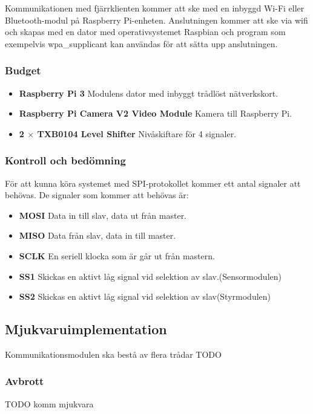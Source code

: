 \documentclass[designspec/spec.tex]{subfiles}
\begin{document}
Kommunikationen med fjärrklienten kommer att ske med en inbyggd Wi-Fi eller
Bluetooth-modul på Raspberry Pi-enheten. Anslutningen kommer att ske via wifi
och skapas med en dator med operativsystemet Raspbian och program som
exempelvis wpa\_supplicant kan användas för att sätta upp anslutningen.

\subsubsection{Budget}
\begin{itemize}
    \item \textbf{Raspberry Pi 3} Modulens dator med inbyggt trådlöst
    nätverkskort.
    \item \textbf{Raspberry Pi Camera V2 Video Module} Kamera till Raspberry
    Pi.
    \item \textbf{2 $\times$ TXB0104 Level Shifter} Nivåskiftare för 4
    signaler.
\end{itemize}

\subsubsection{Kontroll och bedömning}
För att kunna köra systemet med SPI-protokollet kommer ett antal signaler att
behövas. De signaler som kommer att behövas är:
\begin{itemize}
    \item \textbf{MOSI} Data in till slav, data ut från master.
    \item \textbf{MISO} Data från slav, data in till master.
    \item \textbf{SCLK} En seriell klocka som är går ut från mastern.
    \item \textbf{SS1}  Skickas en aktivt låg signal vid selektion av
        slav.(Sensormodulen)
    \item \textbf{SS2}  Skickas en aktivt låg signal vid selektion av
        slav(Styrmodulen)
\end{itemize}

\subsection{Mjukvaruimplementation}
Kommunikationsmodulen ska bestå av flera trådar TODO

\subsubsection{Avbrott}

TODO komm mjukvara
\end{document}
